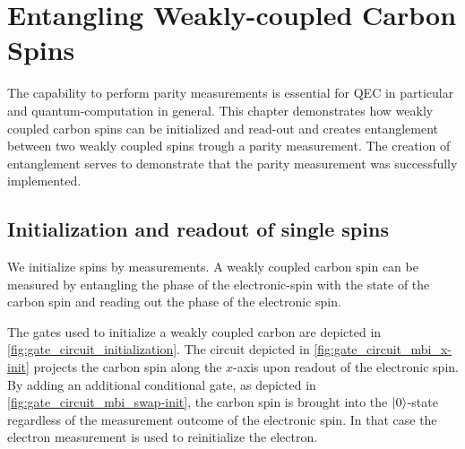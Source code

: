 \chapter{Entangling Weakly-coupled Carbon Spins}
\label{chap:control_weakly_carbon}
The capability to perform parity measurements is essential for QEC in particular and quantum-computation in general.
This chapter demonstrates how weakly coupled carbon spins can be initialized and read-out and creates entanglement between two weakly coupled spins trough a parity measurement.
The creation of entanglement serves to demonstrate that the parity measurement was successfully implemented.

\section{Initialization and readout of single spins}
\label{sec:carbon_init_and_readout}
We initialize spins by measurements.
A weakly coupled carbon spin can be measured by entangling the phase of the electronic-spin with the state of the carbon spin and reading out the phase of the electronic spin.

The gates used to initialize a weakly coupled carbon are depicted in \cref{fig:gate_circuit_initialization}.
The circuit depicted in \cref{fig:gate_circuit_mbi_x-init} projects the carbon spin along the $x$-axis upon readout of the electronic spin.
By adding an additional conditional gate, as depicted in \cref{fig:gate_circuit_mbi_swap-init}, the carbon spin is brought into the ${\left\vert{0}\right\rangle}$-state regardless of the measurement outcome of the electronic spin.
In that case the electron measurement is used to reinitialize the electron.


